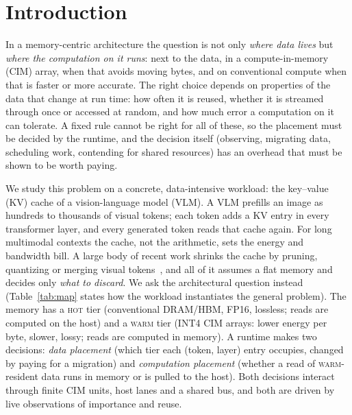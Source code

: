 \documentclass[10pt,a4paper]{article}
\newcommand{\hot}{\textsc{hot}}
\newcommand{\warm}{\textsc{warm}}
\begin{document}
\section{Introduction}
In a memory-centric architecture the question is not only \emph{where data lives} but \emph{where the computation on it runs}: next to the data, in a compute-in-memory (CIM) array, when that avoids moving bytes, and on conventional compute when that is faster or more accurate. The right choice depends on properties of the data that change at run time: how often it is reused, whether it is streamed through once or accessed at random, and how much error a computation on it can tolerate. A fixed rule cannot be right for all of these, so the placement must be decided by the runtime, and the decision itself (observing, migrating data, scheduling work, contending for shared resources) has an overhead that must be shown to be worth paying.

We study this problem on a concrete, data-intensive workload: the key--value (KV) cache of a vision-language model (VLM). A VLM prefills an image as hundreds to thousands of visual tokens; each token adds a KV entry in every transformer layer, and every generated token reads that cache again. For long multimodal contexts the cache, not the arithmetic, sets the energy and bandwidth bill. A large body of recent work shrinks the cache by pruning, quantizing or merging visual tokens~\cite{vlcache,zipvl,aircache,topv,fastv}, and all of it assumes a flat memory and decides only \emph{what to discard}. We ask the architectural question instead (Table~\ref{tab:map} states how the workload instantiates the general problem). The memory has a \hot{} tier (conventional DRAM/HBM, FP16, lossless; reads are computed on the host) and a \warm{} tier (INT4 CIM arrays: lower energy per byte, slower, lossy; reads are computed in memory). A runtime makes two decisions: \emph{data placement} (which tier each (token, layer) entry occupies, changed by paying for a migration) and \emph{computation placement} (whether a read of \warm{}-resident data runs in memory or is pulled to the host). Both decisions interact through finite CIM units, host lanes and a shared bus, and both are driven by live observations of importance and reuse.
\end{document}
